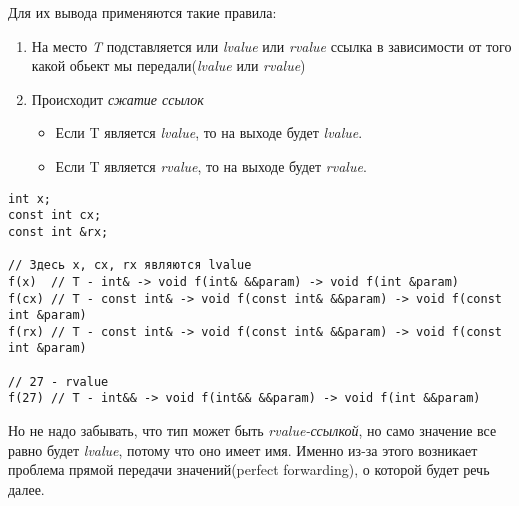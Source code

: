 			Для их вывода применяются такие правила:
			\begin{enumerate}
				\item На место \textit{T} подставляется или \textit{lvalue} или \textit{rvalue} ссылка в зависимости от того какой обьект мы передали(\textit{lvalue} или \textit{rvalue})
				
				\item Происходит \textit{сжатие ссылок}
				\begin{itemize}
					\item Если T является \textit{lvalue}, то на выходе будет \textit{lvalue}. 
					\item Если T является \textit{rvalue}, то на выходе будет \textit{rvalue}. 
				\end{itemize}
				
			\end{enumerate}
\begin{verbatim}
int x;
const int cx;
const int &rx;

// Здесь x, cx, rx являются lvalue
f(x)  // T - int& -> void f(int& &&param) -> void f(int &param)
f(cx) // T - const int& -> void f(const int& &&param) -> void f(const int &param)
f(rx) // T - const int& -> void f(const int& &&param) -> void f(const int &param)

// 27 - rvalue
f(27) // T - int&& -> void f(int&& &&param) -> void f(int &&param)
\end{verbatim}	
			Но не надо забывать, что тип может быть \textit{rvalue-ссылкой}, но само значение все равно будет \textit{lvalue}, потому что оно имеет имя. Именно из-за этого возникает проблема прямой передачи значений(perfect forwarding), о которой будет речь далее.
			
